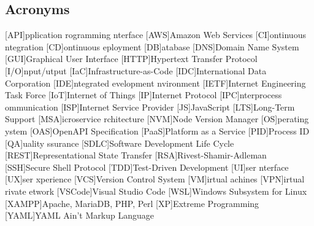 \newcommand{\abbr}{Abbreviations}
\subsection{Acronyms}

\begin{acronym}[1234567890]		%
\setlength{\itemsep}{-\parsep}	%

[API]{pplication rogramming nterface}
[AWS]{Amazon Web Services}
[CI]{ontinuous ntegration}
[CD]{ontinuous eployment}
[DB]{atabase}
[DNS]{Domain Name System}
[GUI]{Graphical User Interface}
[HTTP]{Hypertext Transfer Protocol}
[I/O]{nput/utput}
[IaC]{Infrastructure-as-Code}
[IDC]{International Data Corporation}
[IDE]{ntegrated evelopment nvironment}
[IETF]{Internet Engineering Task Force}
[IoT]{Internet of Things}
[IP]{Internet Protocol}
[IPC]{nterprocess ommunication}
[ISP]{Internet Service Provider}
[JS]{JavaScript}
[LTS]{Long-Term Support}
[MSA]{icroservice rchitecture}
[NVM]{Node Version Manager}
[OS]{perating ystem}
[OAS]{OpenAPI Specification}
[PaaS]{Platform as a Service}
[PID]{Process ID}
[QA]{uality ssurance}
[SDLC]{Software Development Life Cycle}
[REST]{Representational State Transfer}
[RSA]{Rivest-Shamir-Adleman}
[SSH]{Secure Shell Protocol}
[TDD]{Test-Driven Development}
[UI]{ser nterface}
[UX]{ser xperience}
[VCS]{Version Control System}
[VM]{irtual achines}
[VPN]{irtual rivate etwork}
[VSCode]{Visual Studio Code}
[WSL]{Windows Subsystem for Linux}
[XAMPP]{Apache, MariaDB, PHP, Perl}
[XP]{Extreme Programming}
[YAML]{YAML Ain't Markup Language}
\end{acronym}
